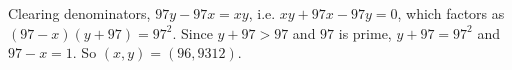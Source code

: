 Clearing denominators, $97y-97x=xy$, i.e. $xy+97x-97y=0$, which factors as $(97-x)(y+97)=97^2$. Since $y+97>97$ and $97$ is prime, $y+97=97^2$ and $97-x=1$. So $(x,y)=\boxed{(96,9312)}$.
